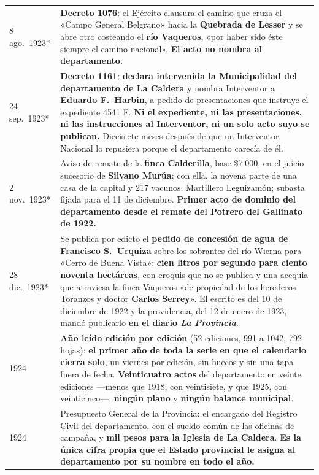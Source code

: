 \begin{longtable}{@{}p{2.7cm}p{10.3cm}@{}}
8 ago.\ 1923* & \textbf{Decreto 1076}: el Ejército clausura el camino que cruza el «Campo General Belgrano» hacia la \textbf{Quebrada de Lesser} y se abre otro costeando el \textbf{río Vaqueros}, «por haber sido éste siempre el camino nacional». \textbf{El acto no nombra al departamento.} \\
24 sep.\ 1923* & \textbf{Decreto 1161}: \textbf{declara intervenida la Municipalidad del departamento de La Caldera} y nombra Interventor a \textbf{Eduardo F.\ Harbin}, a pedido de presentaciones que instruye el expediente 4541 F. \textbf{Ni el expediente, ni las presentaciones, ni las instrucciones al Interventor, ni un solo acto suyo se publican.} Diecisiete meses después de que un Interventor Nacional lo repusiera porque el departamento carecía de él. \\
2 nov.\ 1923* & Aviso de remate de la \textbf{finca Calderilla}, base \$7.000, en el juicio sucesorio de \textbf{Silvano Murúa}\index{Murúa, Silvano}; con ella, la novena parte de una casa de la capital y 217 vacunos. Martillero Leguizamón; subasta fijada para el 11 de diciembre. \textbf{Primer acto de dominio del departamento desde el remate del Potrero del Gallinato de 1922.} \\
28 dic.\ 1923* & Se publica por edicto el \textbf{pedido de concesión de agua de Francisco S.\ Urquiza}\index{Urquiza, Francisco S.} sobre los sobrantes del río Wierna para «Cerro de Buena Vista»: \textbf{cien litros por segundo para ciento noventa hectáreas}, con croquis que no se publica y una acequia que atraviesa la finca Vaqueros «de propiedad de los herederos Toranzos y doctor \textbf{Carlos Serrey}»\index{Serrey, Carlos}. El escrito es del 10 de diciembre de 1922 y la providencia, del 12 de enero de 1923, mandó publicarlo \textbf{en el diario \textit{La Provincia}}. \\
1924 & \textbf{Año leído edición por edición} (52 ediciones, 991 a 1042, 792 hojas): \textbf{el primer año de toda la serie en que el calendario cierra solo}, un viernes por edición, sin huecos y sin una tapa fuera de fecha. \textbf{Veinticuatro actos} del departamento en veinte ediciones ---menos que 1918, con veintisiete, y que 1925, con veinticinco---; \textbf{ningún plano} y \textbf{ningún balance municipal}. \\
1924 & Presupuesto General de la Provincia: el encargado del Registro Civil del departamento, con el sueldo común de las oficinas de campaña, y \textbf{mil pesos para la Iglesia de La Caldera}. \textbf{Es la única cifra propia que el Estado provincial le asigna al departamento por su nombre en todo el año.} \\

\end{longtable}
